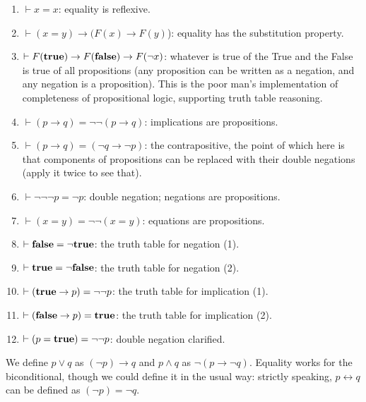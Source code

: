 \documentclass[12pt]{article}
\begin{document}
\begin{enumerate}

\item $\vdash x=x$:  equality is reflexive.

\item $\vdash (x=y) \rightarrow (F(x) \rightarrow F(y)$):  equality has the substitution property.

\item $\vdash F({\bf true}) \rightarrow F({\bf false}) \rightarrow F(\neg x)$:  whatever is true of the True and the False is true of all propositions (any proposition can be written as a negation, and any negation is a proposition).  This is the poor man's implementation of completeness of propositional logic, supporting truth table reasoning.

\item $\vdash (p \rightarrow q) = \neg \neg (p \rightarrow q)$:  implications are propositions.

\item $\vdash (p \rightarrow q) = (\neg q \rightarrow \neg p)$:  the contrapositive, the point of which here is that components of propositions can be replaced with their double negations (apply it twice to see that).

\item $\vdash \neg \neg \neg p = \neg p$:  double negation;  negations are propositions.

\item $\vdash (x = y) = \neg \neg (x = y)$:  equations are propositions.

\item $\vdash {\bf false} = \neg {\bf true}$: the truth table for negation (1).

\item $\vdash {\bf true} = \neg {\bf false}$:  the truth table for negation (2).

\item $\vdash ({\bf true} \rightarrow p) = \neg \neg p$:  the truth table for implication (1).

\item $\vdash ({\bf false} \rightarrow p) = {\bf true}$:  the truth table for implication (2).

\item $\vdash (p = {\bf true}) = \neg \neg p$:  double negation clarified.

\end{enumerate}

We define $p \vee q$ as $(\neg p) \rightarrow q$ and $p \wedge q$ as $\neg(p \rightarrow \neg q)$.  Equality works for the biconditional, though we could define it in the usual way:  strictly speaking, 
$p \leftrightarrow q$ can be defined as $(\neg p) = \neg q$.
\end{document}
